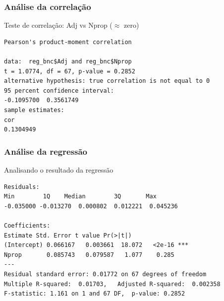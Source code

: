 \documentclass[graphics,14pt]{beamer}
\begin{document}
\begin{frame}[t,fragile=singleslide]
\frametitle{Análise da correlação}
\vspace{0.5cm}
Teste de correlação: Adj vs Nprop ($\approx$ zero)
\vspace{0.5cm}

\begin{lstlisting}
Pearson's product-moment correlation

data:  reg_bnc$Adj and reg_bnc$Nprop
t = 1.0774, df = 67, p-value = 0.2852
alternative hypothesis: true correlation is not equal to 0
95 percent confidence interval:
-0.1095700  0.3561749
sample estimates:
cor 
0.1304949
\end{lstlisting}
\end{frame}
\begin{frame}[t,fragile=singleslide]
\frametitle{Análise da regressão}
\vspace{1cm}
Analisando o resultado da regressão
\vspace{0.5cm}
\begin{lstlisting}
Residuals:
Min        1Q    Median        3Q       Max 
-0.035000 -0.013270  0.000802  0.012221  0.045236 

Coefficients:
Estimate Std. Error t value Pr(>|t|)    
(Intercept) 0.066167   0.003661  18.072   <2e-16 ***
Nprop       0.085743   0.079587   1.077    0.285    
---
Residual standard error: 0.01772 on 67 degrees of freedom
Multiple R-squared:  0.01703,	Adjusted R-squared:  0.002358 
F-statistic: 1.161 on 1 and 67 DF,  p-value: 0.2852
\end{lstlisting}
\end{frame}
\end{document}
